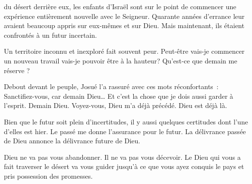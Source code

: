 


 du désert derrière eux,
 les enfants d'Israël sont sur le point de commencer
 une expérience entièrement nouvelle avec le Seigneur.
 Quarante années d'errance leur avaient beaucoup appris
 sur eux-mêmes et sur Dieu.
 Mais maintenant, ils étaient confrontés à un futur incertain.

Un territoire inconnu et inexploré fait souvent peur.
 Peut-être vais-je commencer un nouveau travail
 \ocadr vais-je pouvoir être à la hauteur?
 Qu'est-ce que demain me réserve ?

Debout devant le peuple, Josué l'a rassuré avec ces mots réconfortants~:
 \og Sanctifiez-vous, car demain Dieu\dots{} \fg{}
 Et c'est la chose que je dois aussi garder à l'esprit.
 \og Demain Dieu. \fg{}
 Voyez-vous, Dieu m'a déjà précédé. Dieu est déjà là.

Bien que le futur soit plein d'incertitudes, il y aussi quelques certitudes
 \ocadr dont l'une d'elles est hier.
 Le passé me donne l'assurance pour le futur.
 La délivrance passée de Dieu annonce la délivrance future de Dieu.


Dieu ne va pas vous abandonner. Il ne va pas vous décevoir.
 Le Dieu qui vous a fait traverser le désert va vous guider
 jusqu'à ce que vous ayez conquis le pays et pris possession des promesses. 

\dvrule






